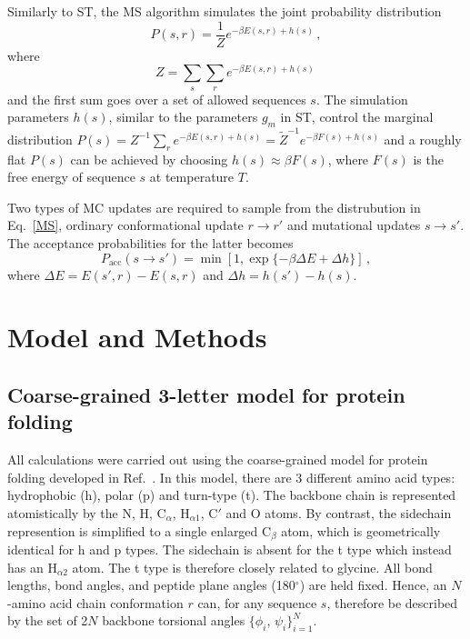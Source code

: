 \documentclass[
aip,
rsi,%
amsmath,amssymb,
reprint,%
]{revtex4-1}
\newcommand	 {\sbar}	{{s}}
\newcommand	 {\rbar}	{{r}}
\begin{document}
Similarly to ST, the MS algorithm simulates the joint probability distribution
\begin{equation}
P(\sbar,\rbar) =\dfrac{1}{Z}e^{-\beta E(\sbar,\rbar) + h(\sbar)}\,, 
\label{MS}
\end{equation}
where  
\begin{equation}
Z = \sum_{\sbar}\sum_{\rbar} e^{-\beta E(\sbar,\rbar)+ h(\sbar)}\,
\end{equation}
and the first sum goes over a set of allowed sequences $\sbar$. The simulation parameters $h(\sbar)$, similar to the parameters $g_m$ in ST, control the marginal distribution $P(\sbar)=Z^{-1}\sum_{\rbar} e^{-\beta E(\sbar,\rbar)+ h(\sbar)} = \tilde{Z}^{-1}e^{-\beta F(\sbar)+ h(\sbar)}$ and a roughly flat $P(\sbar)$ can be achieved by choosing $h(\sbar) \approx \beta F(\sbar)$, where $F(\sbar)$ is the free energy of sequence $\sbar$ at temperature $T$. 

Two types of MC updates are required to sample from the distrubution in Eq.~\ref{MS}, ordinary conformational update $\rbar\rightarrow\rbar'$ and mutational updates $\sbar\rightarrow\sbar'$. The acceptance probabilities for the latter  becomes
\begin{equation}
P_\mathrm{acc} (\sbar\rightarrow\sbar') = \min [1, \exp\{-\beta\Delta E+\Delta h\}]\,,
\label{accrej}
\end{equation}
where $\Delta E = E(\sbar',\rbar)-E(\sbar,\rbar)$ and $\Delta h = h({\sbar'})-h(\sbar)$.

\section{Model and Methods}
\subsection{Coarse-grained 3-letter model for protein folding}
\noindent
All calculations were carried out using the coarse-grained model for protein folding developed in Ref.~. In this model, there are 3 different amino acid types: hydrophobic (h), polar (p) and turn-type (t). The backbone chain is represented atomistically by the N, H, $\mathrm{C}_\alpha$, $\mathrm{H}_{\alpha 1}$, C$'$ and O atoms. By contrast, the sidechain represention is simplified to a single enlarged $\mathrm{C}_\beta$ atom, which is geometrically identical for h and p types. The sidechain is absent for the t type which instead has an $\mathrm{H}_{\alpha 2}$ atom. The t type is therefore closely related to glycine. All bond lengths, bond angles, and peptide plane angles (180$^\circ$) are held fixed. Hence, an $N$-amino acid chain conformation $\rbar$ can, for any sequence $\sbar$, therefore be described by the set of 2$N$ backbone torsional angles $\{\phi_i$, $\psi_i\}_{i=1}^{N}$. 
 
\end{document}
